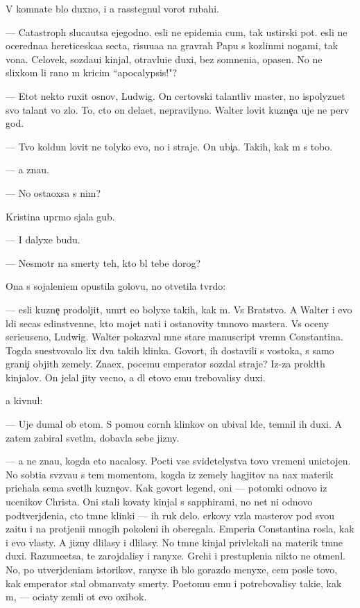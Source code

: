\documentclass[10pt]{book}
\begin{document}
V komnate b{\yi}lo duxno, i {\y}a rasstegnul vorot rubahi.

— Catastroph{\yi} sluca{\y}utsa {\y}ejegodno. {\Y}esli ne epidemi{\y}a cum{\yi}, tak {\y}ustirski{\y} pot. {\Y}esli ne oceredna{\y}a hereticeska{\y}a secta, risu{\y}u{\x}a{\y}a na grav{\io}rah Papu s kozlin{\yi}mi nogami, tak vo{\y}na. Celovek, sozda{\y}u{\x}i{\y} kinjal{\yi}, otravl{\ia}{\y}u{\x}i{\y}e duxi, bez somneni{\y}a, opasen. No ne slixkom li rano m{\yi} kricim ``apocalypsis!"?

— Etot nekto ruxit osnov{\yi}, Ludwig. On certovski talantliv{\yi}{\y} master, no ispolyzu{\y}et svo{\y} talant vo zlo. To, cto on dela{\y}et, nepravilyno. Walter lovit kuzne{\c}a uje ne perv{\yi}{\y} god.

— Tvo{\y} koldun lovit ne tolyko {\y}evo, no i straje{\y}. On ubi{\y}{\c}a. Takih, kak m{\yi} s tobo{\y}.

— {\Y}a zna{\y}u.

— No osta{\y}oxsa s nim?

Kristina upr{\ia}mo sjala gub{\yi}.

— I dalyxe budu.

— Nesmotr{\ia} na smerty teh, kto b{\yi}l tebe dorog?

Ona s sojaleni{\y}em opustila golovu, no otvetila tv{\e}rdo:

— {\Y}esli kuzne{\c} prodoljit, umr{\e}t {\y}e{\x}o bolyxe takih, kak m{\yi}. Vs{\e} Bratstvo. A Walter i {\y}evo l{\io}di se{\y}cas {\y}edinstvenn{\yi}{\y}e, kto mojet na{\y}ti i ostanovity t{\e}mnovo mastera. Vs{\e} oceny serieuseno, Ludwig. Walter pokaz{\yi}val mne star{\yi}{\y}e manuscript{\yi} vrem{\e}n Constantina. Togda su{\x}estvovalo lix dva takih klinka. Govor{\ia}t, ih dostavili s vostoka, s samo{\y} grani{\c}i objit{\yi}h zemely. Zna{\y}ex, pocemu emperator sozdal straje{\y}? Iz-za prokl{\ia}t{\yi}h kinjalov. On jelal jity vecno, a dl{\ia} etovo {\y}emu trebovalisy duxi.

{\Y}a kivnul:

— Uje dumal ob etom. S pomo{\x}{\y}u corn{\yi}h klinkov on ubival l{\io}de{\y}, temnil ih duxi. A zatem zabiral svetl{\yi}m, dobavl{\ia}{\y}a sebe jizny.

— {\Y}a ne zna{\y}u, kogda eto nacalosy. Pocti vse svidetelystva tovo vremeni unictojen{\yi}. No sob{\yi}ti{\y}a sv{\ia}z{\yi}va{\y}u s tem momentom, kogda iz zemely hagjitov na nax materik pri{\y}ehala sem{\y}a svetl{\yi}h kuzne{\c}ov. Kak govor{\ia}t legend{\yi}, oni — potomki odnovo iz ucenikov Christa. Oni stali kovaty kinjal{\yi} s sapphirami, no net ni odnovo podtverjdeni{\y}a, cto t{\e}mn{\yi}{\y}e klinki — ih ruk delo. {\C}erkovy vz{\ia}la masterov pod svo{\y}u za{\x}itu i na prot{\ia}jeni{\y}i mnogih pokoleni{\y} ih oberegala. Emperi{\y}a Constantina rosla, kak i {\y}evo vlasty. A jizny dlilasy i dlilasy. No t{\e}mn{\yi}{\y}e kinjal{\yi} privlekali na materik t{\e}mn{\yi}{\y}e duxi. Razume{\y}etsa, te zarojdalisy i ranyxe. Grehi i prestupleni{\y}a nikto ne otmen{\ia}l. No, po utverjdeni{\y}am istorikov, ranyxe ih b{\yi}lo gorazdo menyxe, cem posle tovo, kak emperator stal obman{\yi}vaty smerty. Poetomu {\y}emu i potrebovalisy taki{\y}e, kak m{\yi}, — oci{\x}aty zemli ot {\y}evo oxibok.
\end{document}
